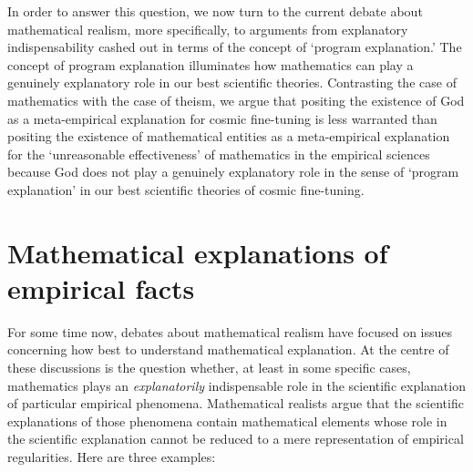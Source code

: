 \documentclass[a4paper,12pt]{article}
\begin{document}
In order to answer this question, we now turn to the current debate about mathematical realism, more specifically, to arguments from explanatory indispensability cashed out in terms of the concept of `program explanation.' The concept of program explanation illuminates how mathematics can play a genuinely explanatory role in our best scientific theories. Contrasting the case of mathematics with the case of theism, we argue that positing the existence of God as a meta-empirical explanation for cosmic fine-tuning is less warranted than positing the existence of mathematical entities as a meta-empirical explanation for the `unreasonable effectiveness' of mathematics in the empirical sciences because God does not play a genuinely explanatory role in the sense of `program explanation' in our best scientific theories of cosmic fine-tuning.

\section{Mathematical explanations of empirical facts}

For some time now, debates about mathematical realism have focused on issues concerning how best to understand mathematical explanation. At the centre of these discussions is the question whether, at least in some specific cases, mathematics plays an \textit{explanatorily} indispensable role in the scientific explanation of particular empirical phenomena. Mathematical realists argue that the scientific explanations of those phenomena contain mathematical elements whose role in the scientific explanation cannot be reduced to a mere representation of empirical regularities. Here are three examples:
\end{document}
